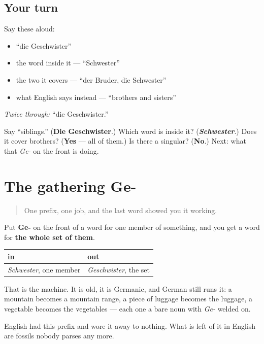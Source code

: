 \subsection*{Your turn}
Say these aloud:

\begin{itemize}
\raggedright
  \item \textquotedblleft{}die Geschwister\textquotedblright{}
  \item the word inside it — \textquotedblleft{}Schwester\textquotedblright{}
  \item the two it covers — \textquotedblleft{}der Bruder, die Schwester\textquotedblright{}
  \item what English says instead — \textquotedblleft{}brothers and sisters\textquotedblright{}
\end{itemize}

\emph{Twice through:} \textquotedblleft{}die Geschwister.\textquotedblright{}

\begin{tcolorbox}[breakable,colback=teal!4,colframe=teal!35!black,title={Before you move on}]
Say \textquotedblleft{}siblings.\textquotedblright{} (\textbf{Die Geschwister}.) Which word is inside it? (\emph{\textbf{Schwester}}.) Does it cover brothers? (\textbf{Yes} — all of them.) Is there a singular? (\textbf{No}.) Next: what that \emph{Ge-} on the front is doing.
\end{tcolorbox}
\section[das sammelnde Ge-]{The gathering Ge-}

\label{lesson:GE-C10-ge-kollektiv}



\begin{quote}
One prefix, one job, and the last word showed you it working.
\end{quote}

\begin{grammarlens}[title={Grammar Lens: one member in, a whole set out}]
Put \textbf{Ge-} on the front of a word for one member of something, and you get a word for \textbf{the whole set of them}.

\noindent
\begin{tabularx}{\linewidth}{@{}>{\raggedright\arraybackslash}X>{\raggedright\arraybackslash}X@{}}
\toprule
\textbf{in} & \textbf{out} \\
\midrule
\emph{Schwester}, one member & \emph{Geschwister}, the set \\
\bottomrule
\end{tabularx}

That is the machine. It is old, it is Germanic, and German still runs it: a mountain becomes a mountain range, a piece of luggage becomes the luggage, a vegetable becomes the vegetables — each one a bare noun with \emph{Ge-} welded on.

English had this prefix and wore it away to nothing. What is left of it in English are fossils nobody parses any more.
\end{grammarlens}

